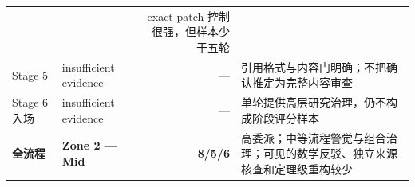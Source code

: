 \documentclass[12pt,a4paper]{article}
\begin{document}
\begin{longtable}[]{@{}llrl@{}}
\begin{minipage}[t]{0.20\columnwidth}
\end{minipage} & \begin{minipage}[t]{0.27\columnwidth}\raggedleft
---\strut
\end{minipage} & \begin{minipage}[t]{0.20\columnwidth}\raggedright
exact-patch 控制很强，但样本少于五轮\strut
\end{minipage}\tabularnewline
\begin{minipage}[t]{0.20\columnwidth}\raggedright
Stage 5\strut
\end{minipage} & \begin{minipage}[t]{0.20\columnwidth}\raggedright
insufficient evidence\strut
\end{minipage} & \begin{minipage}[t]{0.27\columnwidth}\raggedleft
---\strut
\end{minipage} & \begin{minipage}[t]{0.20\columnwidth}\raggedright
引用格式与内容门明确；不把确认推定为完整内容审查\strut
\end{minipage}\tabularnewline
\begin{minipage}[t]{0.20\columnwidth}\raggedright
Stage 6 入场\strut
\end{minipage} & \begin{minipage}[t]{0.20\columnwidth}\raggedright
insufficient evidence\strut
\end{minipage} & \begin{minipage}[t]{0.27\columnwidth}\raggedleft
---\strut
\end{minipage} & \begin{minipage}[t]{0.20\columnwidth}\raggedright
单轮提供高层研究治理，仍不构成阶段评分样本\strut
\end{minipage}\tabularnewline
\begin{minipage}[t]{0.20\columnwidth}\raggedright
\textbf{全流程}\strut
\end{minipage} & \begin{minipage}[t]{0.20\columnwidth}\raggedright
\textbf{Zone 2 --- Mid}\strut
\end{minipage} & \begin{minipage}[t]{0.27\columnwidth}\raggedleft
\textbf{8/5/6}\strut
\end{minipage} & \begin{minipage}[t]{0.20\columnwidth}\raggedright
高委派；中等流程警觉与组合治理；可见的数学反驳、独立来源核查和定理级重构较少\strut
\end{minipage}\tabularnewline
\bottomrule
\end{longtable}
\end{document}
